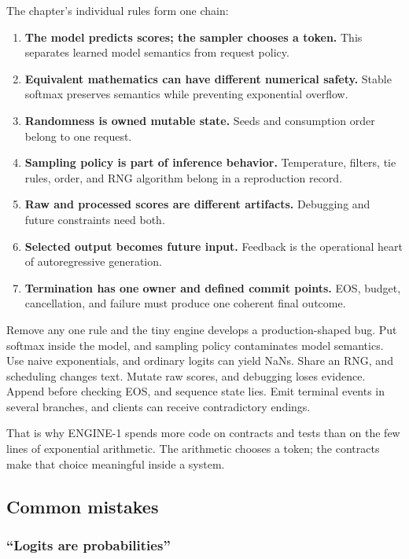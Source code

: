 \documentclass[
  10pt,
]{article}
\providecommand{\tightlist}{%
  \setlength{\itemsep}{0pt}\setlength{\parskip}{0pt}}
\begin{document}
The chapter's individual rules form one chain:

\begin{enumerate}
\def\labelenumi{\arabic{enumi}.}
\tightlist
\item
  \textbf{The model predicts scores; the sampler chooses a token.} This
  separates learned model semantics from request policy.
\item
  \textbf{Equivalent mathematics can have different numerical safety.}
  Stable softmax preserves semantics while preventing exponential
  overflow.
\item
  \textbf{Randomness is owned mutable state.} Seeds and consumption
  order belong to one request.
\item
  \textbf{Sampling policy is part of inference behavior.} Temperature,
  filters, tie rules, order, and RNG algorithm belong in a reproduction
  record.
\item
  \textbf{Raw and processed scores are different artifacts.} Debugging
  and future constraints need both.
\item
  \textbf{Selected output becomes future input.} Feedback is the
  operational heart of autoregressive generation.
\item
  \textbf{Termination has one owner and defined commit points.} EOS,
  budget, cancellation, and failure must produce one coherent final
  outcome.
\end{enumerate}

Remove any one rule and the tiny engine develops a production-shaped
bug. Put softmax inside the model, and sampling policy contaminates
model semantics. Use naive exponentials, and ordinary logits can yield
NaNs. Share an RNG, and scheduling changes text. Mutate raw scores, and
debugging loses evidence. Append before checking EOS, and sequence state
lies. Emit terminal events in several branches, and clients can receive
contradictory endings.

That is why ENGINE-1 spends more code on contracts and tests than on the
few lines of exponential arithmetic. The arithmetic chooses a token; the
contracts make that choice meaningful inside a system.

\subsection{Common mistakes}\label{common-mistakes-3}

\subsubsection{``Logits are
probabilities''}\label{logits-are-probabilities}
\end{document}
